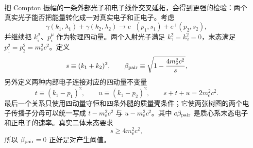 把 Compton 振幅的一条外部光子和电子线作交叉延拓，会得到更强的检验：两个真实光子能否把能量转化成一对真实电子和正电子。考虑
\begin{equation*}
 \gamma(k_1,\lambda_1)+\gamma(k_2,\lambda_2)
 \longrightarrow e^-(p_1,s_1)+e^+(p_2,s_2),
\end{equation*}
并继续把 $k_i^\mu$、$p_i^\mu$ 作为物理四动量。两个入射光子满足 $k_1^2=k_2^2=0$，末态满足 $p_1^2=p_2^2=m_{\mathrm e}^2c^2$。定义
\begin{equation}
 s\equiv(k_1+k_2)^2,
 \qquad
 \beta_{\rm pair}\equiv
 \sqrt{1-\frac{4m_{\mathrm e}^2c^2}{s}},
 \label{eq:BW-beta-pair-dp49}
\end{equation}
另外定义两种内部电子连接对应的四动量不变量
\begin{equation}
 t\equiv(k_1-p_1)^2,
 \qquad
 u\equiv(k_1-p_2)^2,
 \qquad
 s+t+u=2m_{\mathrm e}^2c^2.
 \label{eq:BW-stu-si-r12}
\end{equation}
最后一个关系只使用四动量守恒和四条外腿的质量壳条件；它使两张树图的两个电子传播子分母可以统一写成 $t-m_{\mathrm e}^2c^2$ 与 $u-m_{\mathrm e}^2c^2$。其中 $c\beta_{\rm pair}$ 是质心系末态电子和正电子的速率。真实二体末态要求
\begin{equation*}
 s\ge 4m_{\mathrm e}^2c^2,
\end{equation*}
所以 $\beta_{\rm pair}=0$ 正好是对产生阈值。

